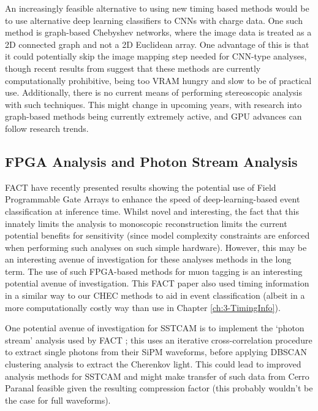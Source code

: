 An increasingly feasible alternative to using new timing based methods would be to use alternative deep learning classifiers to CNNs with charge data. One such method is graph-based Chebyshev networks, where the image data is treated as a 2D connected graph and not a 2D Euclidean array. One advantage of this is that it could potentially skip the image mapping step needed for CNN-type analyses, though recent results from \cite{adithesis} suggest that these methods are currently computationally prohibitive, being too VRAM hungry and slow to be of practical use. Additionally, there is no current means of performing stereoscopic analysis with such techniques. This might change in upcoming years, with research into graph-based methods being currently extremely active, and GPU advances can follow research trends.

\subsection{FPGA Analysis and Photon Stream Analysis}

FACT have recently presented results showing the potential use of Field Programmable Gate Arrays to enhance the speed of deep-learning-based event classification at inference time. Whilst novel and interesting, the fact that this innately limits the analysis to monoscopic reconstruction limits the current potential benefits for sensitivity (since model complexity constraints are enforced when performing such analyses on such simple hardware). However, this may be an interesting avenue of investigation for these analyses methods in the long term. The use of such FPGA-based methods for muon tagging is an interesting potential avenue of investigation. This FACT paper also used timing information in a similar way to our CHEC methods to aid in event classification (albeit in a more computationally costly way than use in Chapter \ref{ch:3-TimingInfo}).

One potential avenue of investigation for SSTCAM is to implement the `photon stream' analysis used by FACT \cite{factphotonstream}; this uses an iterative cross-correlation procedure to extract single photons from their SiPM waveforms, before applying DBSCAN clustering analysis to extract the Cherenkov light. This could lead to improved analysis methods for SSTCAM and might make transfer of such data from Cerro Paranal feasible given the resulting compression factor (this probably wouldn't be the case for full waveforms).

